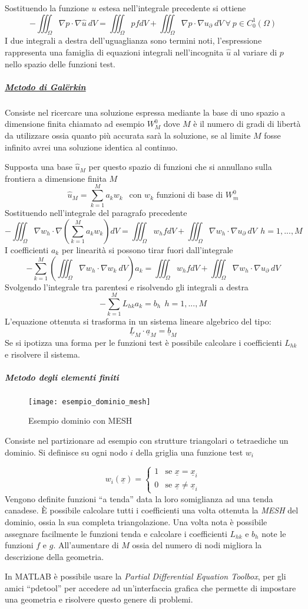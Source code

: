 Sostituendo la funzione $u$ estesa nell'integrale precedente si ottiene
$$
-\iiint_\Omega \nabla p \cdot \nabla\hat{u}\  dV = \iiint_\Omega p f dV +
\iiint_\Omega \nabla p \cdot \nabla u_\partial\ dV\ \forall\ p\in C^1_0(\Omega)
$$
I due integrali a destra dell'uguaglianza sono termini noti, l'espressione rappresenta
una famiglia di equazioni integrali nell'incognita $\hat{u}$ al variare
di $p$ nello spazio delle funzioni test.

\newpage
\subparagraph{\href{https://it.wikipedia.org/wiki/Metodo_di_Gal\%C3\%ABrkin}{Metodo di Galërkin}}
Consiste nel ricercare una soluzione espressa mediante la base di uno spazio
a dimensione finita chiamato ad esempio $W^0_M$ dove $M$ è il numero di
gradi di libertà da utilizzare ossia quanto più accurata sarà la soluzione,
se al limite $M$ fosse infinito avrei una soluzione identica al continuo.

Supposta una base $\hat{u}_M$ per questo spazio di funzioni che si 
annullano sulla frontiera a dimensione finita $M$
$$
\hat{u}_M = \sum_{k = 1}^{M} a_k w_k \ \ \text{ con } w_k \text{ funzioni di base di } W_m^0
$$
Sostituendo nell'integrale del paragrafo precedente
$$
-\iiint_\Omega \nabla w_h \cdot \nabla \left(\sum_{k=1}^{M} a_k w_k \right) dV = 
\iiint_\Omega w_h f dV + \iiint_\Omega \nabla w_h \cdot \nabla u_\partial\ dV\ \ h=1,...,M
$$
I coefficienti $a_k$ per linearità si possono tirar fuori dall'integrale
$$
-\sum_{k=1}^M \left(\iiint_\Omega \nabla w_h \cdot \nabla w_k\ dV \right) a_k = 
\iiint_\Omega w_h f dV + \iiint_\Omega \nabla w_h \cdot \nabla u_\partial\ dV
$$
Svolgendo l'integrale tra parentesi e risolvendo gli integrali a destra
$$
-\sum_{k=1}^M L_{hk} a_k = b_h\ \ h=1,...,M
$$
L'equazione ottenuta si trasforma in un sistema lineare algebrico del tipo:
$$
\underline{L}_M \cdot \underline{a}_M = \underline{b}_M
$$
Se si ipotizza una forma per le funzioni test è possibile calcolare i coefficienti
$L_{hk}$ e risolvere il sistema.

\newpage
\subparagraph{Metodo degli elementi finiti}
\begin{figure}[H]
\centering
\texttt{[image: esempio\_dominio\_mesh]}
\caption{Esempio dominio con MESH}
\end{figure}
Consiste nel partizionare ad esempio con strutture triangolari o tetraediche un dominio.
Si definisce su ogni nodo $i$ della griglia una funzione test $w_i$

$$
w_i(\underline{x}) = \begin{cases}
1 & \text{se } \underline{x} = \underline{x}_i\\
0 & \text{se } \underline{x} \neq \underline{x}_i
\end{cases}
$$
Vengono definite funzioni ``a tenda'' data la loro somiglianza ad una tenda canadese.
È possibile calcolare tutti i coefficienti una volta ottenuta la \textit{MESH} del
dominio, ossia la sua completa triangolazione.
Una volta nota è possibile assegnare facilmente le funzioni tenda e calcolare i
coefficienti $L_{hk}$ e $b_h$ note le funzioni $f$ e $g$.
All'aumentare di $M$ ossia del numero di nodi migliora la descrizione
della geometria.

In MATLAB è possibile usare la \textit{Partial Differential Equation Toolbox}, per 
gli amici ``pdetool'' per accedere ad un'interfaccia grafica che permette
di impostare una geometria e risolvere questo genere di problemi.
